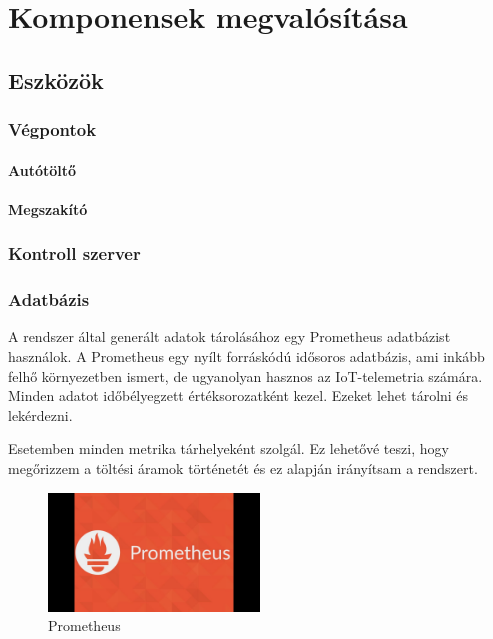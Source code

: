 \chapter{Komponensek megvalósítása}

\section{Eszközök}

\subsection{Végpontok}

\subsubsection{Autótöltő}

\subsubsection{Megszakító}

\subsection{Kontroll szerver}

\subsection{Adatbázis}

A rendszer által generált adatok tárolásához egy Prometheus adatbázist használok. 
A Prometheus egy nyílt forráskódú idősoros adatbázis, ami inkább felhő környezetben ismert, 
de ugyanolyan hasznos az IoT-telemetria számára. Minden adatot időbélyegzett értéksorozatként kezel.
Ezeket lehet tárolni és lekérdezni.
\cite{electrofunsmart:iotserver}
\cite{prometheus:dimenzionális}

Esetemben minden metrika tárhelyeként szolgál. Ez lehetővé teszi, 
hogy megőrizzem a töltési áramok történetét és ez alapján irányítsam a rendszert.

\begin{figure}[!ht]
    \centering
    \includegraphics[width=0.5\textwidth, keepaspectratio]{figures/maxresdefault.jpg}
    \caption{Prometheus \cite{youtube:someid}} 
\end{figure}

